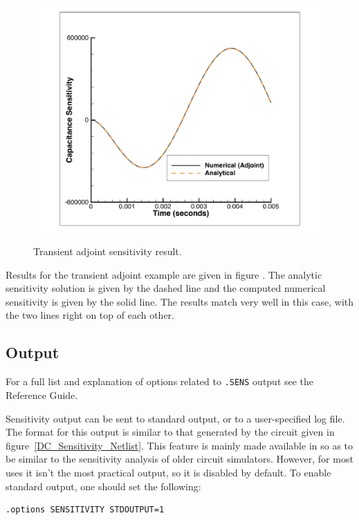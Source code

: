 \begin{figure}[ht]
  \centering
  \scalebox{0.5}
  {\includegraphics[]{sensCapGearAdj}}
  \caption[Transient adjoint sensitivity result]
  {Transient adjoint sensitivity result.
\label{transientAdjointSensitivityResult}}
\end{figure}
Results for the transient adjoint example are given in figure .
The analytic sensitivity solution is given by the dashed line and the computed numerical
sensitivity is given by the solid line.  The results match very well in this case,
with the two lines right on top of each other.

\clearpage
\subsection{Output}
\label{SENS_Output}
For a full list and explanation of options related to \texttt{.SENS} output see 
the \Xyce{} Reference Guide\ReferenceGuide{}.

Sensitivity output can be sent to standard output, or to a user-specified
log file.  The format for this output is similar to that generated by the circuit
given in figure~\ref{DC_Sensitivity_Netlist}.
This feature is mainly made available in \Xyce{} so as to be similar to 
the sensitivity analysis of older circuit simulators.   However, for most uses 
it isn't the most practical output, so it is disabled by default.   To enable standard
output, one should set the following: 
\begin{verbatim}
.options SENSITIVITY STDOUTPUT=1
\end{verbatim}

